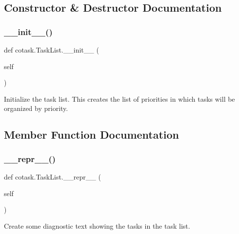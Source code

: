 \subsection{Constructor \& Destructor Documentation}
\mbox{\label{classcotask_1_1_task_list_a288413cdeddf60664542a92ce201200a}} 
\subsubsection{\texorpdfstring{\_\_init\_\_()}{\_\_init\_\_()}}
{\footnotesize\ttfamily def cotask.\+Task\+List.\+\_\+\+\_\+init\+\_\+\+\_\+ (\begin{DoxyParamCaption}\item[{}]{self }\end{DoxyParamCaption})}

\begin{DoxyVerb}Initialize the task list. This creates the list of priorities in
which tasks will be organized by priority. \end{DoxyVerb}
 

\subsection{Member Function Documentation}
\mbox{\label{classcotask_1_1_task_list_aa0632311ba902d3e5d75167dd4215dda}} 
\subsubsection{\texorpdfstring{\_\_repr\_\_()}{\_\_repr\_\_()}}
{\footnotesize\ttfamily def cotask.\+Task\+List.\+\_\+\+\_\+repr\+\_\+\+\_\+ (\begin{DoxyParamCaption}\item[{}]{self }\end{DoxyParamCaption})}

\begin{DoxyVerb}Create some diagnostic text showing the tasks in the task list.
\end{DoxyVerb}
 \mbox{\label{classcotask_1_1_task_list_aa690015d692390e17cb777ff367ae159}} 
